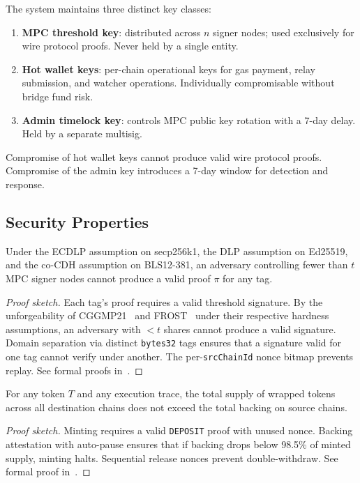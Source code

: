 \begin{definition}
The system maintains three distinct key classes:
\begin{enumerate}[nosep]
  \item \textbf{MPC threshold key}: distributed across $n$ signer nodes; used exclusively for wire protocol proofs. Never held by a single entity.
  \item \textbf{Hot wallet keys}: per-chain operational keys for gas payment, relay submission, and watcher operations. Individually compromisable without bridge fund risk.
  \item \textbf{Admin timelock key}: controls MPC public key rotation with a 7-day delay. Held by a separate multisig.
\end{enumerate}
Compromise of hot wallet keys cannot produce valid wire protocol proofs. Compromise of the admin key introduces a 7-day window for detection and response.
\end{definition}

\subsection{Security Properties}

\begin{theorem}
\label{thm:soundness}
Under the ECDLP assumption on secp256k1, the DLP assumption on Ed25519, and the co-CDH assumption on BLS12-381, an adversary controlling fewer than $t$ MPC signer nodes cannot produce a valid proof $\pi$ for any tag.
\end{theorem}

\begin{proof}[Proof sketch]
Each tag's proof requires a valid threshold signature. By the unforgeability of CGGMP21~\cite{cggmp21} and FROST~\cite{frost} under their respective hardness assumptions, an adversary with $< t$ shares cannot produce a valid signature. Domain separation via distinct \texttt{bytes32} tags ensures that a signature valid for one tag cannot verify under another. The per-\texttt{srcChainId} nonce bitmap prevents replay. See formal proofs in~\cite{luxproof-teleport}.
\end{proof}

\begin{theorem}[Conservation]
\label{thm:conservation}
For any token $T$ and any execution trace, the total supply of wrapped tokens across all destination chains does not exceed the total backing on source chains.
\end{theorem}

\begin{proof}[Proof sketch]
Minting requires a valid \texttt{DEPOSIT} proof with unused nonce. Backing attestation with auto-pause ensures that if backing drops below 98.5\% of minted supply, minting halts. Sequential release nonces prevent double-withdraw. See formal proof in~\cite{luxproof-teleport}.
\end{proof}

